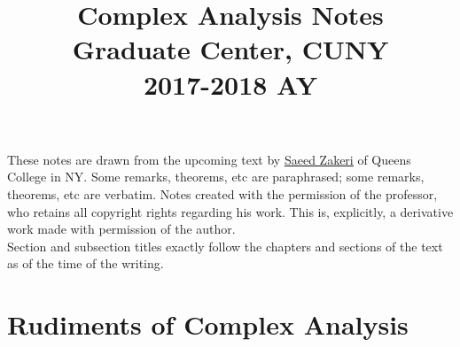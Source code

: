\documentclass{article}
\title{Complex Analysis Notes\\
Graduate Center, CUNY\\
2017-2018 AY}
\date{}
\begin{document}
\maketitle

{\large These notes are drawn from the upcoming text by \href{http://qcpages.qc.cuny.edu/~zakeri/}{\underline{Saeed Zakeri}} of Queens College in NY. Some remarks, theorems, etc are paraphrased; some remarks, theorems, etc are verbatim. Notes created with the permission of the professor, who retains all copyright rights regarding his work. This is, explicitly, a derivative work made with permission of the author.
\\

\noindent Section and subsection titles exactly follow the chapters and sections of the text as of the time of the writing.}

\newpage

\tableofcontents

\newpage

\section{Rudiments of Complex Analysis}
\end{document}
